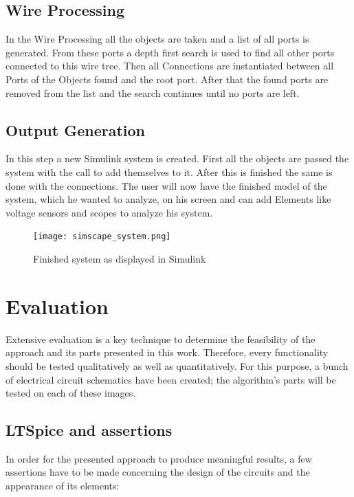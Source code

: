 \documentclass[10pt,twocolumn,letterpaper]{article}
\begin{document}
\subsection{Wire Processing}
In the Wire Processing all the objects are taken and a list of all ports is generated. From these ports a depth first search is used to find all other ports connected to this wire tree. Then all Connections are instantiated between all Ports of the Objects found and the root port. After that the found ports are removed from the list and the search continues until no ports are left.

\subsection{Output Generation}
In this step a new Simulink system is created. First all the objects are passed the system with the call to add themselves to it. After this is finished the same is done with the connections. The user will now have the finished model of the system, which he wanted to analyze, on his screen and can add Elements like voltage sensors and scopes to analyze his system.
\begin{figure}[!ht]
\texttt{[image: simscape\_system.png]}
\caption{Finished system as displayed in Simulink}
\label{fig:o3}
\end{figure}


\section{Evaluation}
\label{sec:eval}

Extensive evaluation is a key technique to determine the feasibility of the approach and its parts presented in this work. Therefore, every functionality should be tested qualitatively as well as quantitatively. For this purpose, a bunch of electrical circuit schematics have been created; the algorithm's parts will be tested on each of these images. 
\par

\subsection{LTSpice and assertions}
\label{subsec:spice}

In order for the presented approach to produce meaningful results, a few assertions have to be made concerning the design of the circuits and the appearance of its elements:
\end{document}
